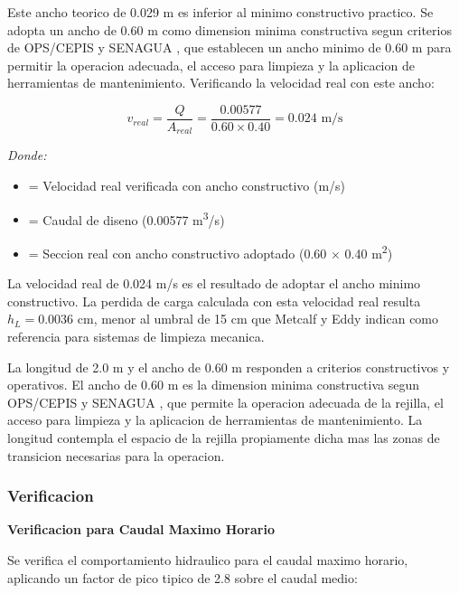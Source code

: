 \documentclass[12pt,a4paper]{article}
\begin{document}
Este ancho teorico de 0.029 m es inferior al minimo constructivo practico. Se adopta un ancho de 0.60 m como dimension minima constructiva segun criterios de OPS/CEPIS \cite{ops2005} y SENAGUA \cite{senagua2012}, que establecen un ancho minimo de 0.60 m para permitir la operacion adecuada, el acceso para limpieza y la aplicacion de herramientas de mantenimiento. Verificando la velocidad real con este ancho:

\begin{equation}
v_{{real}} = \frac{Q}{A_{{real}}} = \frac{0.00577}{0.60 \times 0.40} = 0.024 \text{ m/s}
\end{equation}

\textit{Donde:}
\begin{itemize}[noitemsep,leftmargin=2em]
    \item[$v_{{real}}$] = Velocidad real verificada con ancho constructivo (m/s)
    \item[$Q$] = Caudal de diseno (0.00577 m\textsuperscript{3}/s)
    \item[$A_{{real}}$] = Seccion real con ancho constructivo adoptado (0.60 $\times$ 0.40 m\textsuperscript{2})
\end{itemize}

La velocidad real de 0.024 m/s es el resultado de adoptar el ancho minimo constructivo. La perdida de carga calculada con esta velocidad real resulta $h_L = 0.0036$ cm, menor al umbral de 15 cm que Metcalf y Eddy \cite{metcalf2014} indican como referencia para sistemas de limpieza mecanica.

La longitud de 2.0 m y el ancho de 0.60 m responden a criterios constructivos y operativos. El ancho de 0.60 m es la dimension minima constructiva segun OPS/CEPIS \cite{ops2005} y SENAGUA \cite{senagua2012}, que permite la operacion adecuada de la rejilla, el acceso para limpieza y la aplicacion de herramientas de mantenimiento. La longitud contempla el espacio de la rejilla propiamente dicha mas las zonas de transicion necesarias para la operacion.





\subsubsection{Verificacion}

\textbf{Verificacion para Caudal Maximo Horario}

Se verifica el comportamiento hidraulico para el caudal maximo horario, aplicando un factor de pico tipico de 2.8 sobre el caudal medio:
\end{document}
